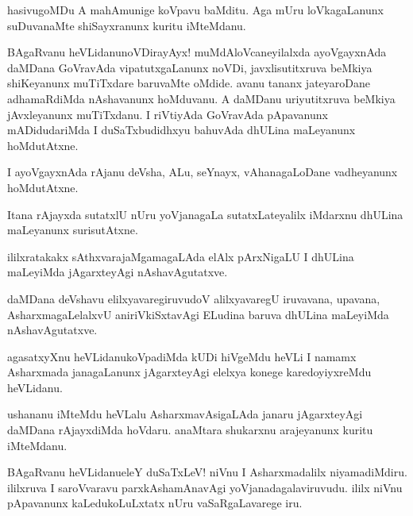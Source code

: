 \begin{mng}
hasivugoMDu A mahAmunige koVpavu baMditu. Aga mUru loVkagaLanunx suDuvanaMte shiSayxranunx kuritu iMteMdanu.
\end{mng}

\begin{mng}
BAgaRvanu heVLidanu\mdash noVDirayAyx! muMdAloVcaneyilalxda ayoVgayxnAda daMDana GoVravAda vipatutxgaLanunx noVDi, javxlisutitxruva beMkiya shiKeyanunx muTiTxdare baruvaMte oMdide. avanu tananx jateyaroDane adhamaRdiMda nAshavanunx hoMduvanu. A daMDanu uriyutitxruva beMkiya jAvxleyanunx muTiTxdanu. I riVtiyAda GoVravAda pApavanunx mADidudariMda I duSaTxbudidhxyu bahuvAda dhULina maLeyanunx hoMdutAtxne.
\end{mng}

\begin{mng}
I ayoVgayxnAda rAjanu deVsha, ALu, seYnayx, vAhanagaLoDane vadheyanunx hoMdutAtxne.
\end{mng}

\begin{mng}
Itana rAjayxda sutatxlU nUru yoVjanagaLa sutatxLateyalilx iMdarxnu dhULina maLeyanunx surisutAtxne.
\end{mng}

\begin{mng}
ililxratakakx sAthxvarajaMgamagaLAda elAlx pArxNigaLU I dhULina maLeyiMda jAgarxteyAgi nAshavAgutatxve.
\end{mng}

\begin{mng}
daMDana deVshavu elilxyavaregiruvudoV alilxyavaregU iruvavana, upavana, AsharxmagaLelalxvU aniriVkiSxtavAgi ELudina baruva dhULina maLeyiMda nAshavAgutatxve.
\end{mng}

\begin{mng}
agasatxyXnu heVLidanu\mdash koVpadiMda kUDi hiVgeMdu heVLi I namamx Asharxmada janagaLanunx jAgarxteyAgi elelxya konege karedoyiyxreMdu heVLidanu.
\end{mng}

\begin{mng}
ushananu iMteMdu heVLalu AsharxmavAsigaLAda janaru jAgarxteyAgi daMDana rAjayxdiMda hoVdaru. anaMtara shukarxnu arajeyanunx kuritu iMteMdanu.
\end{mng}

\begin{mng}
BAgaRvanu heVLidanu\mdash eleY duSaTxLeV! niVnu I Asharxmadalilx niyamadiMdiru. ililxruva I saroVvaravu parxkAshamAnavAgi yoVjanadagalaviruvudu. ililx niVnu pApavanunx kaLedukoLuLxtatx nUru vaSaRgaLavarege iru.
\end{mng}

